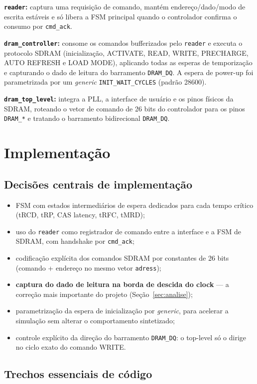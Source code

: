 \documentclass[12pt,a4paper]{article}
\begin{document}
\textbf{\texttt{reader}:} captura uma requisição de comando, mantém
endereço/dado/modo de escrita estáveis e só libera a FSM principal quando o
controlador confirma o consumo por \texttt{cmd\_ack}.

\textbf{\texttt{dram\_controller}:} consome os comandos bufferizados pelo
\texttt{reader} e executa o protocolo SDRAM (inicialização, ACTIVATE, READ, WRITE,
PRECHARGE, AUTO REFRESH e LOAD MODE), aplicando todas as esperas de temporização e
capturando o dado de leitura do barramento \texttt{DRAM\_DQ}. A espera de power-up
foi parametrizada por um \emph{generic} \texttt{INIT\_WAIT\_CYCLES} (padrão 28600).

\textbf{\texttt{dram\_top\_level}:} integra a PLL, a interface de usuário e os pinos
físicos da SDRAM, roteando o vetor de comando de 26 bits do controlador para os
pinos \texttt{DRAM\_*} e tratando o barramento bidirecional \texttt{DRAM\_DQ}.

\section{Implementação}
\subsection{Decisões centrais de implementação}
\begin{itemize}
  \item FSM com estados intermediários de espera dedicados para cada tempo crítico
        (tRCD, tRP, CAS latency, tRFC, tMRD);
  \item uso do \texttt{reader} como registrador de comando entre a interface e a
        FSM de SDRAM, com handshake por \texttt{cmd\_ack};
  \item codificação explícita dos comandos SDRAM por constantes de 26 bits
        (comando + endereço no mesmo vetor \texttt{adress});
  \item \textbf{captura do dado de leitura na borda de descida do clock} --- a
        correção mais importante do projeto (Seção~\ref{sec:analise});
  \item parametrização da espera de inicialização por \emph{generic}, para acelerar
        a simulação sem alterar o comportamento sintetizado;
  \item controle explícito da direção do barramento \texttt{DRAM\_DQ}: o top-level
        só o dirige no ciclo exato do comando WRITE.
\end{itemize}

\subsection{Trechos essenciais de código}
\end{document}
